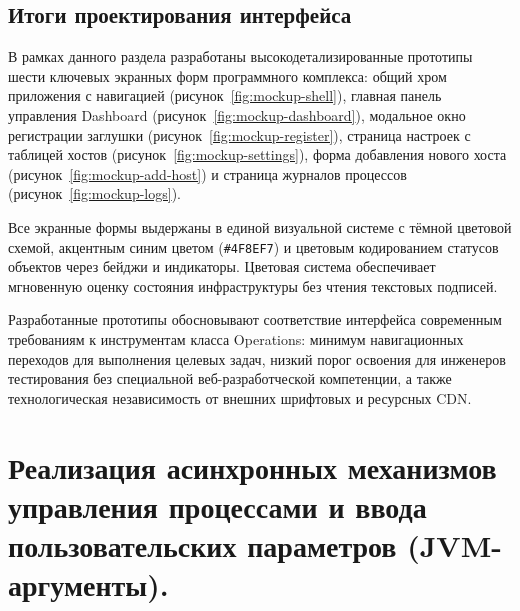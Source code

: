 

\subsection{Итоги проектирования интерфейса}

В рамках данного раздела разработаны высокодетализированные прототипы шести ключевых экранных форм программного комплекса: общий хром приложения с навигацией (рисунок~\ref{fig:mockup-shell}), главная панель управления Dashboard (рисунок~\ref{fig:mockup-dashboard}), модальное окно регистрации заглушки (рисунок~\ref{fig:mockup-register}), страница настроек с таблицей хостов (рисунок~\ref{fig:mockup-settings}), форма добавления нового хоста (рисунок~\ref{fig:mockup-add-host}) и страница журналов процессов (рисунок~\ref{fig:mockup-logs}).

Все экранные формы выдержаны в единой визуальной системе с тёмной цветовой схемой, акцентным синим цветом (\texttt{\#4F8EF7}) и цветовым кодированием статусов объектов через бейджи и индикаторы. Цветовая система обеспечивает мгновенную оценку состояния инфраструктуры без чтения текстовых подписей.

Разработанные прототипы обосновывают соответствие интерфейса современным требованиям к инструментам класса Operations: минимум навигационных переходов для выполнения целевых задач, низкий порог освоения для инженеров тестирования без специальной веб-разработческой компетенции, а также технологическая независимость от внешних шрифтовых и ресурсных CDN.

\section{Реализация асинхронных механизмов управления процессами и ввода пользовательских параметров (JVM-аргументы). }
